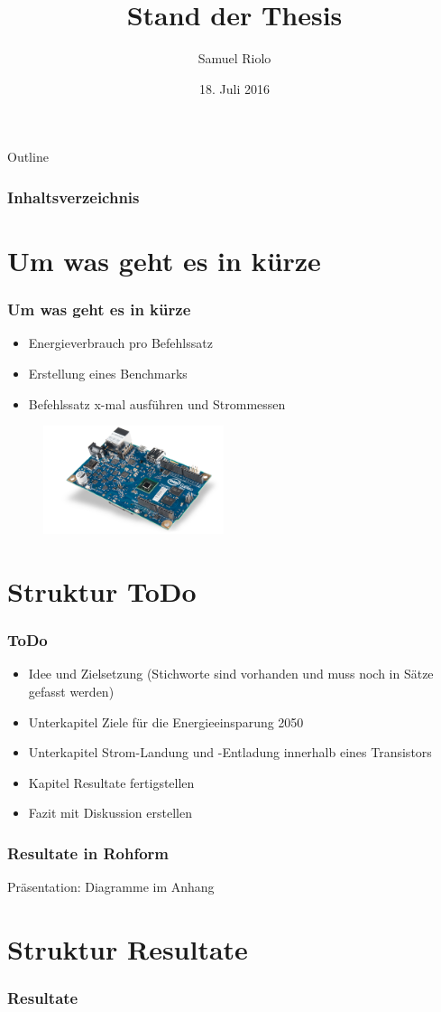 \documentclass{beamer}
\title[Energie in der Informatik]{Stand der Thesis}
\author{Samuel Riolo}
\institute{FFHS}
\date{18. Juli 2016}
\begin{document}
\begin{frame}
  \titlepage
\end{frame}

\begin{frame}{Outline}
\frametitle{Inhaltsverzeichnis}
    \tableofcontents[]
\end{frame}



\section{Um was geht es in k{\"u}rze} 
\begin{frame}
\frametitle{Um was geht es in k{\"u}rze} 
\begin{itemize}
\item Energieverbrauch pro Befehlssatz
\item Erstellung eines Benchmarks
\item Befehlssatz x-mal ausführen und Strommessen
\end{itemize}


\begin{figure}
  \includegraphics[width=200px,height=120px]{iot_galileo.png}
\end{figure}	

\end{frame}


\section{Struktur ToDo} 
\begin{frame}
\frametitle{ToDo}
\begin{itemize}
\item Idee und Zielsetzung (Stichworte sind vorhanden und muss noch in Sätze gefasst werden)
\item Unterkapitel Ziele für die Energieeinsparung 2050
\item Unterkapitel Strom-Landung und -Entladung innerhalb eines Transistors
\item Kapitel Resultate fertigstellen
\item Fazit mit Diskussion erstellen
\end{itemize}

\end{frame}

\begin{frame}
\frametitle{Resultate in Roh­form} 
\Huge Präsentation: Diagramme im Anhang
\end{frame}

\section{Struktur Resultate}
\begin{frame}
\frametitle{Resultate} 
\begin{minipage}{0.8\textwidth}


\end{minipage}
\end{frame}
\end{document}
